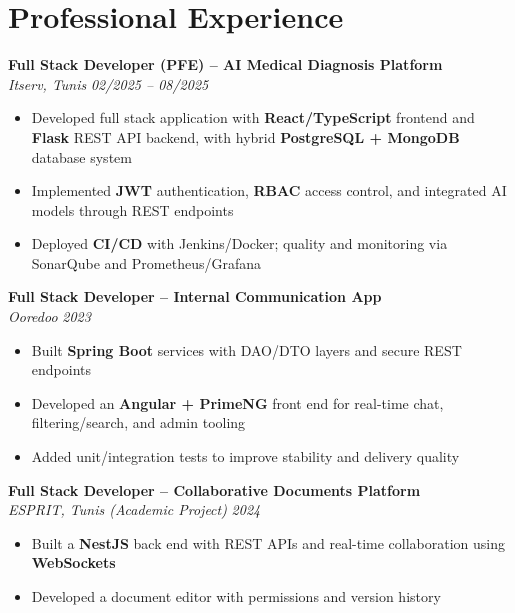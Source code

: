 \documentclass[10pt,a4paper]{article}
\begin{document}
\vspace{6pt}

\section*{Professional Experience}
{\small

\textbf{Full Stack Developer (PFE) -- AI Medical Diagnosis Platform}\\[1pt]
\textit{Itserv, Tunis} \hfill \textit{02/2025 -- 08/2025}
\begin{itemize}
  \item Developed full stack application with \textbf{React/TypeScript} frontend and \textbf{Flask} REST API backend, with hybrid \textbf{PostgreSQL + MongoDB} database system
  \item Implemented \textbf{JWT} authentication, \textbf{RBAC} access control, and integrated AI models through REST endpoints
  \item Deployed \textbf{CI/CD} with Jenkins/Docker; quality and monitoring via SonarQube and Prometheus/Grafana
\end{itemize}

\vspace{3pt}
\textbf{Full Stack Developer -- Internal Communication App}\\[1pt]
\textit{Ooredoo} \hfill \textit{2023}
\begin{itemize}
  \item Built \textbf{Spring Boot} services with DAO/DTO layers and secure REST endpoints
  \item Developed an \textbf{Angular + PrimeNG} front end for real-time chat, filtering/search, and admin tooling
  \item Added unit/integration tests to improve stability and delivery quality
\end{itemize}

\vspace{3pt}
\textbf{Full Stack Developer -- Collaborative Documents Platform}\\[1pt]
\textit{ESPRIT, Tunis (Academic Project)} \hfill \textit{2024}
\begin{itemize}
  \item Built a \textbf{NestJS} back end with REST APIs and real-time collaboration using \textbf{WebSockets}
  \item Developed a document editor with permissions and version history
\end{itemize}

}
\end{document}
